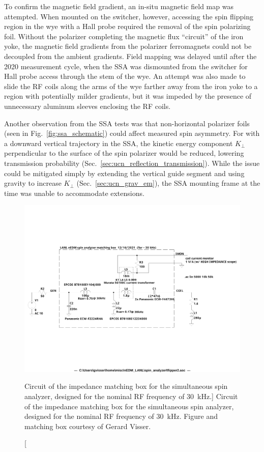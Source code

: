 To confirm the magnetic field gradient, an in-situ magnetic field map was attempted. When mounted on the switcher, however, accessing the spin flipping region in the wye with a Hall probe required the removal of the spin polarizing foil. Without the polarizer completing the magnetic flux ``circuit'' of the iron yoke, the magnetic field gradients from the polarizer ferromagnets could not be decoupled from the ambient gradients. Field mapping was delayed until after the 2020 measurement cycle, when the SSA was dismounted from the switcher for Hall probe access through the stem of the wye. An attempt was also made to slide the RF coils along the arms of the wye farther away from the iron yoke to a region with potentially milder gradients, but it was impeded by the presence of unnecessary aluminum sleeves enclosing the RF coils.

Another observation from the SSA tests was that non-horizontal polarizer foils (seen in Fig.~\ref{fig:ssa_schematic}) could affect measured spin asymmetry. For \ucn with a downward vertical trajectory in the SSA, the kinetic energy component $K_\perp$ perpendicular to the surface of the spin polarizer would be reduced, lowering transmission probability (Sec.~\ref{sec:ucn_reflection_transmission}). While the issue could be mitigated simply by extending the vertical guide segment and using gravity to increase $K_\perp$ (Sec.~\ref{sec:ucn_grav_em}), the SSA mounting frame at the time was unable to accommodate extensions.

\begin{figure}[htp]
    \centering
    \includegraphics[width=\textwidth]{figures/matching_box_30kHz.pdf}
    \caption
    [Circuit of the impedance matching box for the simultaneous spin analyzer, designed for the nominal RF frequency of \qty{30}{kHz}.]
    {Circuit of the impedance matching box for the simultaneous spin analyzer, designed for the nominal RF frequency of \qty{30}{kHz}. Figure and matching box courtesy of Gerard Visser.}
    \label{fig:ssa_matching_box}
\end{figure}

